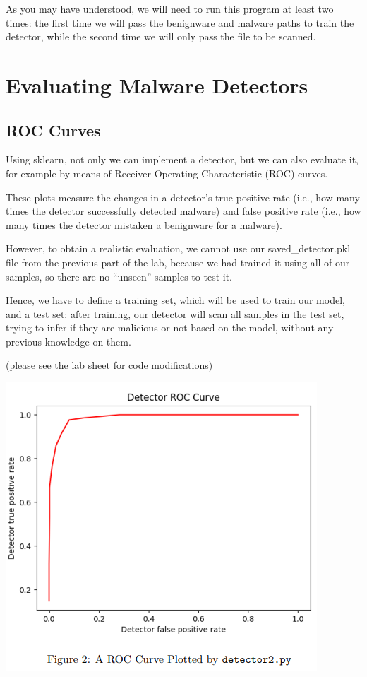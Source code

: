 \documentclass[]{project_plan}
\begin{document}
As you may have understood, we will need to run this program at least two
times: the first time we will pass the benignware and malware paths to train the
detector, while the second time we will only pass the file to be scanned.

\section{Evaluating Malware Detectors}

\subsection{ROC Curves}
Using sklearn, not only we can implement a detector, but we can also evaluate
it, for example by means of Receiver Operating Characteristic (ROC) curves.

These plots measure the changes in a detector’s true positive rate (i.e., how
many times the detector successfully detected malware) and false positive rate
(i.e., how many times the detector mistaken a benignware for a malware).

However, to obtain a realistic evaluation, we cannot use our saved\_detector.pkl
file from the previous part of the lab, because we had trained it using all
of our samples, so there are no “unseen” samples to test it.

Hence, we have to
define a training set, which will be used to train our model, and a test set: after
training, our detector will scan all samples in the test set, trying to infer if they
are malicious or not based on the model, without any previous knowledge on
them.

(please see the lab sheet for code modifications)

\includegraphics[width=.6\linewidth]{ROC.png}
\end{document}
